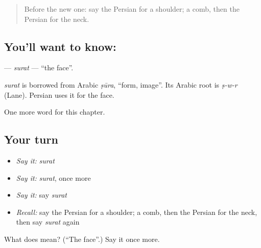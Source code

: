 \label{lesson:FA-C28-surat}



\begin{quote}
Before the new one: say the Persian for a shoulder; a comb, then the Persian for the neck.
\end{quote}

\subsection*{You'll want to know: }
\textbf{} — \emph{surat} — \textquotedblleft{}the face\textquotedblright{}.

\begin{cousinweb}
\emph{surat} is borrowed from Arabic \emph{ṣūra}, \textquotedblleft{}form, image\textquotedblright{}. Its Arabic root is \emph{ṣ-w-r} (Lane). Persian uses it for the face.
\end{cousinweb}

\begin{grammarlens}[title={What you've built}]
One more word for this chapter.
\end{grammarlens}

\subsection*{Your turn}
\begin{itemize}
\raggedright
  \item \emph{Say it:} \emph{surat}
  \item \emph{Say it:} \emph{surat}, once more
  \item \emph{Say it:} say \emph{surat}
  \item \emph{Recall:} say the Persian for a shoulder; a comb, then the Persian for the neck, then say \emph{surat} again
\end{itemize}

\begin{tcolorbox}[breakable,colback=teal!4,colframe=teal!35!black,title={Before you move on}]
What does  mean? (\textquotedblleft{}The face\textquotedblright{}.) Say it once more.
\end{tcolorbox}
